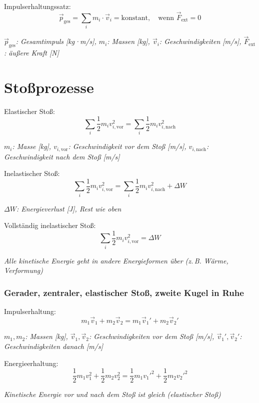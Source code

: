\documentclass[a5paper,10pt]{article}
\newenvironment{displayformula}
{
	\begin{framed}
		\color{formulaColor}
	}
	{\end{framed}}
\newcommand{\formulalegend}[1]{%
	\par\vspace{0.5ex}%
	{{\color{legendColor}\RaggedRight\small\textit{#1}}}%
	\par\vspace{1.5ex}%
}
\begin{document}
\begin{displayformula}
	Impulserhaltungssatz:
	\[
	\vec{p}_{\text{ges}} = \sum_i m_i \cdot \vec{v}_i = \text{konstant}, \quad \text{wenn } \vec{F}_{\text{ext}} = 0
	\]
\end{displayformula}
\formulalegend{
	\( \vec{p}_{\text{ges}} \): Gesamtimpuls [kg·m/s], \( m_i \): Massen [kg], \( \vec{v}_i \): Geschwindigkeiten [m/s], \( \vec{F}_{\text{ext}} \): äußere Kraft [N]
}
\newpage
\section{Stoßprozesse}

\begin{displayformula}
	Elastischer Stoß:
	\[
	\sum_i \frac{1}{2} m_i v_{i,\text{vor}}^2 = \sum_i \frac{1}{2} m_i v_{i,\text{nach}}^2
	\]
\end{displayformula}
\formulalegend{
	\( m_i \): Masse [kg], \( v_{i,\text{vor}} \): Geschwindigkeit vor dem Stoß [m/s], \( v_{i,\text{nach}} \): Geschwindigkeit nach dem Stoß [m/s]
}

\begin{displayformula}
	Inelastischer Stoß:
	\[
	\sum_i \frac{1}{2} m_i v_{i,\text{vor}}^2 = \sum_i \frac{1}{2} m_i v_{i,\text{nach}}^2 + \Delta W
	\]
\end{displayformula}
\formulalegend{
	\( \Delta W \): Energieverlust [J], Rest wie oben
}
\begin{displayformula}
	Vollständig inelastischer Stoß:
	\[
	\sum_i \frac{1}{2} m_i v_{i,\text{vor}}^2 = \Delta W
	\]
\end{displayformula}
\formulalegend{
	Alle kinetische Energie geht in andere Energieformen über (z.\,B. Wärme, Verformung)
}
\newpage
\subsubsection{Gerader, zentraler, elastischer Stoß, zweite Kugel in Ruhe}

\begin{displayformula}
	Impulserhaltung:
	\[
	m_1 \vec{v}_1 + m_2 \vec{v}_2 = m_1 \vec{v}_1' + m_2 \vec{v}_2'
	\]
\end{displayformula}
\formulalegend{
	\( m_1, m_2 \): Massen [kg], \( \vec{v}_1, \vec{v}_2 \): Geschwindigkeiten vor dem Stoß [m/s], \( \vec{v}_1', \vec{v}_2' \): Geschwindigkeiten danach [m/s]
}

\begin{displayformula}
	Energieerhaltung:
	\[
	\frac{1}{2} m_1 v_1^2 + \frac{1}{2} m_2 v_2^2 = \frac{1}{2} m_1 {v_1'}^2 + \frac{1}{2} m_2 {v_2'}^2
	\]
\end{displayformula}
\formulalegend{
	Kinetische Energie vor und nach dem Stoß ist gleich (elastischer Stoß)
}
\end{document}
